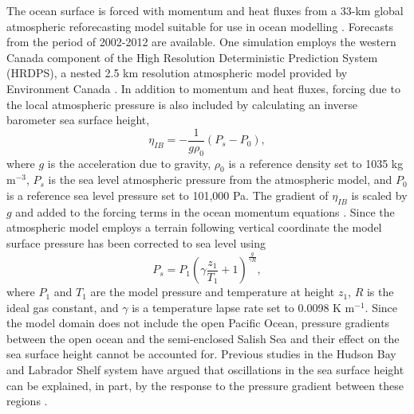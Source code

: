 \documentclass{tATO2e}
\begin{document}
The ocean surface is forced with momentum and heat fluxes from a 33-km global atmospheric reforecasting model suitable for use in ocean modelling \citep{smith2014new}. Forecasts from the period of 2002-2012 are available. One simulation employs the western Canada component of the High Resolution Deterministic Prediction System (HRDPS), a nested 2.5 km resolution atmospheric model provided by Environment Canada \citep{ECModel}. In addition to momentum and heat fluxes, forcing due to the local atmospheric pressure is also included by calculating an inverse barometer sea surface height,
\begin{equation}
 \eta_{IB} = -\frac{1}{g\rho_{0}}\left(P_{s}-P_0\right), \label{eq:inverse}
\end{equation}
where $g$ is the acceleration due to gravity, $\rho_{0}$ is a reference density set to 1035 kg m$^{-3}$, $P_{s}$ is the sea level atmospheric pressure from the atmospheric model, and $P_0$ is a reference sea level pressure set to 101,000 Pa.  The gradient of $\eta_{IB}$  is scaled by $g$ and added to the forcing terms in the ocean momentum equations \citep{madec2012nemo}. Since the atmospheric model employs a terrain following vertical coordinate the model surface pressure has been corrected to sea level using \citep{holton1992introduction}
\[ P_s = P_1\left(\gamma\frac{z_1}{T_1} +1 \right)^\frac{g}{\gamma R},\]
where $P_1$ and $T_1$ are the model pressure and temperature at height $z_1$, $R$ is the ideal gas constant, and $\gamma$ is a temperature lapse rate set to 0.0098 K m$^{-1}$. Since the model domain does not include the open Pacific Ocean, pressure gradients between the open ocean and the semi-enclosed Salish Sea and their effect on the sea surface height cannot be accounted for. Previous studies in the Hudson Bay and Labrador Shelf system have argued that oscillations in the sea surface height can be explained, in part, by the response to the pressure gradient between these regions \citep{wright1987influence,young1995synoptic}.
\end{document}

